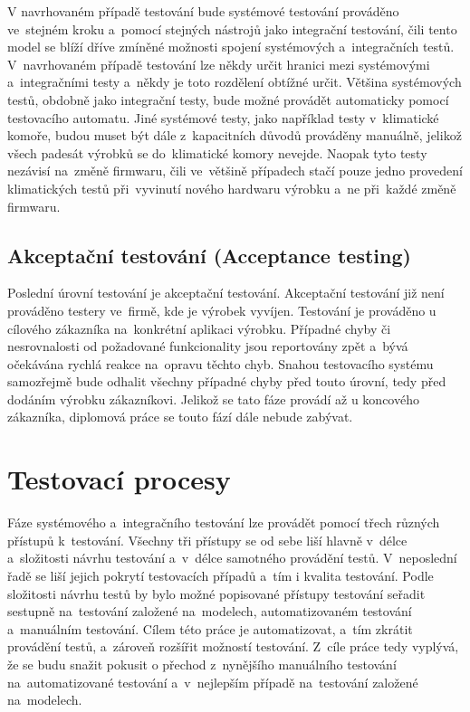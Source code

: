 V navrhovaném případě testování bude systémové testování prováděno ve~stejném kroku a~pomocí stejných nástrojů jako integrační testování, čili tento model se blíží dříve zmíněné možnosti spojení systémových a~integračních testů. V~navrhovaném případě testování lze někdy určit hranici mezi systémovými a~integračními testy a~někdy je toto rozdělení obtížné určit. Většina systémových testů, obdobně jako integrační testy, bude možné provádět automaticky pomocí testovacího automatu. Jiné systémové testy, jako například testy v~klimatické komoře, budou muset být dále z~kapacitních důvodů prováděny manuálně, jelikož všech padesát výrobků se do~klimatické komory nevejde. Naopak tyto testy nezávisí na~změně firmwaru, čili ve~většině případech stačí pouze jedno provedení klimatických testů při~vyvinutí nového hardwaru výrobku a~ne při~každé změně firmwaru.

\subsection{Akceptační testování (Acceptance testing)}
Poslední úrovní testování je akceptační testování. Akceptační testování již není prováděno testery ve~firmě, kde je výrobek vyvíjen. Testování je prováděno u cílového zákazníka na~konkrétní aplikaci výrobku. Případné chyby či nesrovnalosti od požadované funkcionality jsou reportovány zpět a~bývá očekávána rychlá reakce na~opravu těchto chyb. Snahou testovacího systému samozřejmě bude odhalit všechny případné chyby před touto úrovní, tedy před dodáním výrobku zákazníkovi. Jelikož se tato fáze provádí až u koncového zákazníka, diplomová práce se touto fází dále nebude zabývat.

\section{Testovací procesy}
Fáze systémového a~integračního testování lze provádět pomocí třech různých přístupů k~testování. Všechny tři přístupy se od sebe liší hlavně v~délce a~složitosti návrhu testování a~v~délce samotného provádění testů. V~neposlední řadě se liší jejich pokrytí testovacích případů a~tím i kvalita testování. Podle složitosti návrhu testů by bylo možné popisované přístupy testování seřadit sestupně na~testování založené na~modelech, automatizovaném testování a~manuálním testování. Cílem této práce je automatizovat, a~tím zkrátit provádění testů, a~zároveň rozšířit možností testování. Z~cíle práce tedy vyplývá, že se budu snažit pokusit o přechod z~nynějšího manuálního testování na~automatizované testování a~v~nejlepším případě na~testování založené na~modelech.

